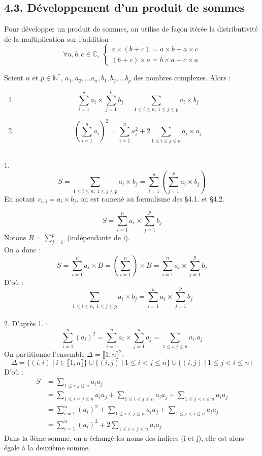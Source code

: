 \documentclass[a4paper,11pt]{article}
\newcommand{\N}{\mathbb{N}}
\newcommand{\C}{\mathbb{C}}
\newcommand{\intN}[2]{\llbracket #1, #2 \rrbracket}
\newcommand{\ens}[1]{\{#1\}}
\newcommand{\encadLEQ}[3]{#1 \leq #2 \leq #3}
\begin{document}
\medskip

\subsection*{4.3. Développement d'un produit de sommes}

Pour développer un produit de sommes, on utilise de façon itérée la distributivité de la multiplication sur l'addition :
$$\forall a,b,c \in \C, \:
\begin{cases}
	a \times (b + c) = a\times b + a\times c \\
	(b + c)\times a = b \times a + c \times a
\end{cases}$$

\begin{proposition}
	Soient $n$ et $p\in\N^*$, $a_1, a_2, ... a_n, b_1, b_2, ... b_p$ des nombres complexes.
	Alors :
	\begin{enumerate}
		\item $$\sum_{i=1}^{n}a_i \times \sum_{j=1}^{p}b_j = \sum_{\encadLEQ{1}{i}{n}, \: \encadLEQ{1}{j}{p}}a_i \times b_j$$
		\item $$(\sum_{i=1}^{n}a_i)^2 = \sum_{i=1}^{n}a_i^2 + 2\sum_{\encadLEQ{1}{i \leq j}{n}}a_i \times a_j$$
	\end{enumerate}
\end{proposition}

\newpage

\begin{demonstration}
	\\
	1.
	$$S = \sum_{\encadLEQ{1}{i}{n}, \: \encadLEQ{1}{j}{p}}a_i \times b_j = \sum_{i=1}^{n}(\sum_{j=1}^{p}a_i\times b_j)$$
	En notant $c_{i, j} = a_i \times b_j$, on est ramené au formalisme des §4.1. et §4.2.
	
	$$S = \sum_{i=1}^{n}a_i \times \sum_{j=1}^{p}b_j$$
	Notons $B = \sum_{j=1}^{p}$ (indépendante de i).\\
	On a donc :
	$$S = \sum_{i=1}^{n}a_i \times B = (\sum_{i=1}^{n})\times B = \sum_{i=1}^{n}a_i \times \sum_{j=1}^{p}b_j$$
	D'où :
	$$\sum_{\encadLEQ{1}{i}{n}, \: \encadLEQ{1}{j}{p}}a_i \times b_j = \sum_{i=1}^{n}a_i \times \sum_{j=1}^{p}b_j $$
	\\
	2. D'après 1. : 
	$$\sum_{i=1}^{n}(a_i)^2 = \sum_{i=1}^{n}a_i \times \sum_{j=1}^{n}a_j = \sum_{\encadLEQ{1}{i, j}{n}}a_i.a_j$$
	On partitionne l'ensemble $\Delta = \intN{1}{n}^2$:
	$$\Delta = \ens{(i, i) \: | \: i \in \intN{1}{n}} \cup \ens{(i, j) \: | \: \encadLEQ{1}{i < j}{n}} \cup \ens{(i, j) \: | \: \encadLEQ{1}{j < i}{n}}$$
	D'où :
	\begin{align*}
		S &= \sum_{\encadLEQ{1}{i, j}{n}}a_ia_j \\
		&= \sum_{\encadLEQ{1}{i=j}{n}}a_ia_j + \sum_{\encadLEQ{1}{i < j}{n}}a_ia_j + \sum_{\encadLEQ{1}{j < i}{n}}a_ia_j \\
		&= \sum_{i=1}^{n}(a_i)^2 + \sum_{\encadLEQ{1}{i < j}{n}}a_ia_j + \sum_{\encadLEQ{1}{j < i}{n}}a_ia_j \\
		&= \sum_{i=1}^{n}(a_i)^2 + 2\sum_{\encadLEQ{1}{i < j}{n}}a_ia_j
	\end{align*}
	Dans la 3ème somme, on a échangé les noms des indices (i et j), elle est alors égale à la deuxième somme.
\end{demonstration}
\end{document}
